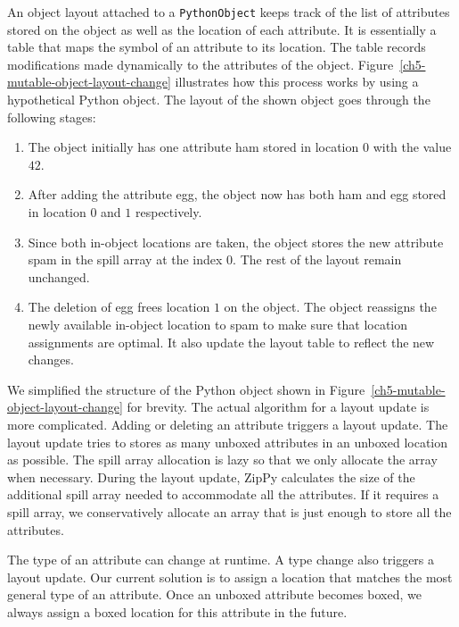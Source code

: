 An object layout attached to a \texttt{PythonObject} keeps track of the list of attributes stored on the object as well as the location of each attribute.
It is essentially a table that maps the symbol of an attribute to its location.
The table records modifications made dynamically to the attributes of the object.
Figure~\ref{ch5-mutable-object-layout-change} illustrates how this process works by using a hypothetical Python object.
The layout of the shown object goes through the following stages:

\begin{enumerate}

\item The object initially has one attribute \textsf{ham} stored in location $0$ with the value $42$.

\item After adding the attribute \textsf{egg}, the object now has both \textsf{ham} and \textsf{egg} stored in location $0$ and $1$ respectively.

\item Since both in-object locations are taken, the object stores the new attribute \textsf{spam} in the spill array at the index $0$.
The rest of the layout remain unchanged.

\item The deletion of \textsf{egg} frees location $1$ on the object.
The object reassigns the newly available in-object location to \textsf{spam} to make sure that location assignments are optimal.
It also update the layout table to reflect the new changes.

\end{enumerate}

We simplified the structure of the Python object shown in Figure~\ref{ch5-mutable-object-layout-change} for brevity.
The actual algorithm for a layout update is more complicated.
Adding or deleting an attribute triggers a layout update.
The layout update tries to stores as many unboxed attributes in an unboxed location as possible.
The spill array allocation is lazy so that we only allocate the array when necessary.
During the layout update, ZipPy calculates the size of the additional spill array needed to accommodate all the attributes.
If it requires a spill array, we conservatively allocate an array that is just enough to store all the attributes.

The type of an attribute can change at runtime.
A type change also triggers a layout update.
Our current solution is to assign a location that matches the most general type of an attribute.
Once an unboxed attribute becomes boxed, we always assign a boxed location for this attribute in the future.

